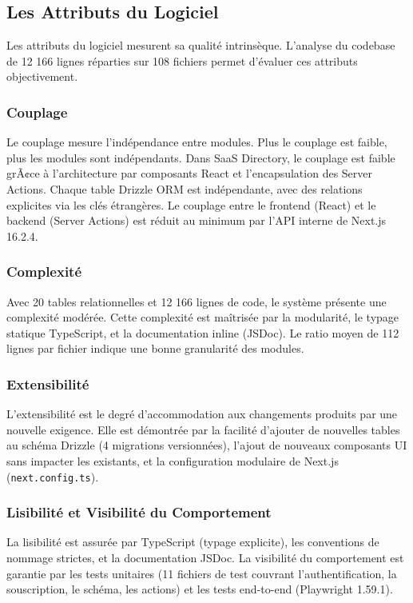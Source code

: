 \subsection{Les Attributs du Logiciel}



Les attributs du logiciel mesurent sa qualité intrinsèque. L'analyse du codebase de 12 166 lignes réparties sur 108 fichiers permet d'évaluer ces attributs objectivement.



\subsubsection{Couplage}



Le couplage mesure l'indépendance entre modules. Plus le couplage est faible, plus les modules sont indépendants. Dans SaaS Directory, le couplage est faible grÃ¢ce à l'architecture par composants React et l'encapsulation des Server Actions. Chaque table Drizzle ORM est indépendante, avec des relations explicites via les clés étrangères. Le couplage entre le frontend (React) et le backend (Server Actions) est réduit au minimum par l'API interne de Next.js 16.2.4.



\subsubsection{Complexité}



Avec 20 tables relationnelles et 12 166 lignes de code, le système présente une complexité modérée. Cette complexité est maîtrisée par la modularité, le typage statique TypeScript, et la documentation inline (JSDoc). Le ratio moyen de 112 lignes par fichier indique une bonne granularité des modules.



\subsubsection{Extensibilité}



L'extensibilité est le degré d'accommodation aux changements produits par une nouvelle exigence. Elle est démontrée par la facilité d'ajouter de nouvelles tables au schéma Drizzle (4 migrations versionnées), l'ajout de nouveaux composants UI sans impacter les existants, et la configuration modulaire de Next.js (\texttt{next.config.ts}).



\subsubsection{Lisibilité et Visibilité du Comportement}



La lisibilité est assurée par TypeScript (typage explicite), les conventions de nommage strictes, et la documentation JSDoc. La visibilité du comportement est garantie par les tests unitaires (11 fichiers de test couvrant l'authentification, la souscription, le schéma, les actions) et les tests end-to-end (Playwright 1.59.1).

